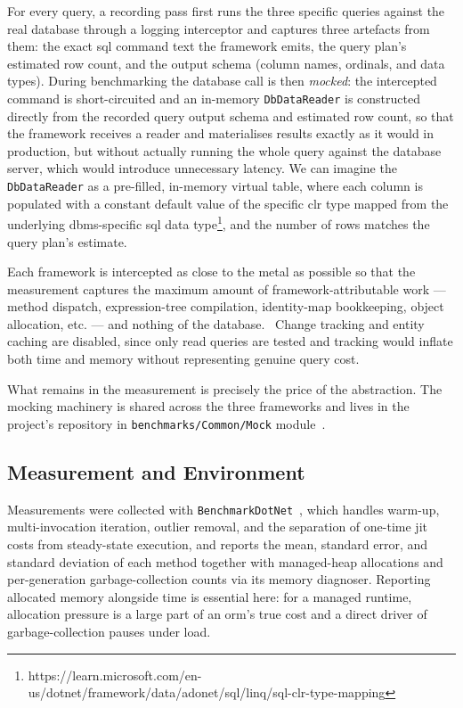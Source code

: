 For every query, a recording pass first runs the three specific queries against the real database through a logging interceptor and captures three artefacts from them: the exact \acrshort{sql} command text the framework emits, the query plan's estimated row count, and the output schema (column names, ordinals, and data types). During benchmarking the database call is then \emph{mocked}: the intercepted command is short-circuited and an in-memory \texttt{DbDataReader} is constructed directly from the recorded query output schema and estimated row count, so that the framework receives a reader and materialises results exactly as it would in production, but without actually running the whole query against the database server, which would introduce unnecessary latency. We can imagine the \texttt{DbDataReader} as a pre-filled, in-memory virtual table, where each column is populated with a constant default value of the specific \Acrfull{clr} type mapped from the underlying \acrshort{dbms}-specific \acrshort{sql} data type\footnote{https://learn.microsoft.com/en-us/dotnet/framework/data/adonet/sql/linq/sql-clr-type-mapping}, and the number of rows matches the query plan's estimate.

Each framework is intercepted as close to the metal as possible so that the measurement captures the maximum amount of framework-attributable work --- method dispatch, expression-tree compilation, identity-map bookkeeping, object allocation, etc. --- and nothing of the database.~\cite{boumaFransBoumaRawDataAccessBencher2026} Change tracking and entity caching are disabled, since only read queries are tested and tracking would inflate both time and memory without representing genuine query cost.

What remains in the measurement is precisely the price of the abstraction. The mocking machinery is shared across the three frameworks and lives in the project's repository in \texttt{benchmarks/Common/Mock} module~\cite{corovcakUOMRepository2026}.

\subsection{Measurement and Environment}
\label{sec:overhead-env}

Measurements were collected with \texttt{BenchmarkDotNet}~\cite{benchmarkdotnet}, which handles warm-up, multi-invocation iteration, outlier removal, and the separation of one-time \acrshort{jit} costs from steady-state execution, and reports the mean, standard error, and standard deviation of each method together with managed-heap allocations and per-generation garbage-collection counts via its memory diagnoser. Reporting allocated memory alongside time is essential here: for a managed runtime, allocation pressure is a large part of an \acrshort{orm}'s true cost and a direct driver of garbage-collection pauses under load.

